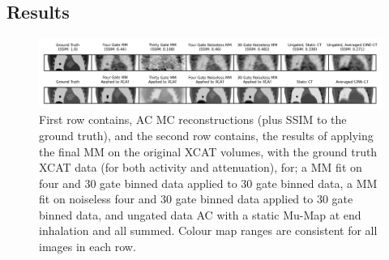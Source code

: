         \subsection{Results} \label{sec:pet_ct_motion_correction_exploiting_motion_models_fit_on_coarsely_gated_data_applied_to_finely_gated_data_results}
            \begin{figure}
                
                \centering
                
                \includegraphics[width=1.0\linewidth]{figures/motion_correction_2_results_1_visual_analysis.png}
                
                
                \captionsetup{singlelinecheck=false, justification=centering}
                \caption{
                First row contains, \gls{AC} \gls{MC} reconstructions (plus \gls{SSIM} to the ground truth), and the second row contains, the results of applying the final \gls{MM} on the original \gls{XCAT} volumes, with the ground truth \gls{XCAT} data (for both activity and attenuation), for; a \gls{MM} fit on four and $30$ gate binned data applied to $30$ gate binned data, a \gls{MM} fit on noiseless four and $30$ gate binned data applied to $30$ gate binned data, and ungated data \gls{AC} with a static \gls{Mu-Map} at end inhalation and all  summed. Colour map ranges are consistent for all images in each row.}
                
                \label{fig:visual_analysis}
                
            \end{figure}
            
